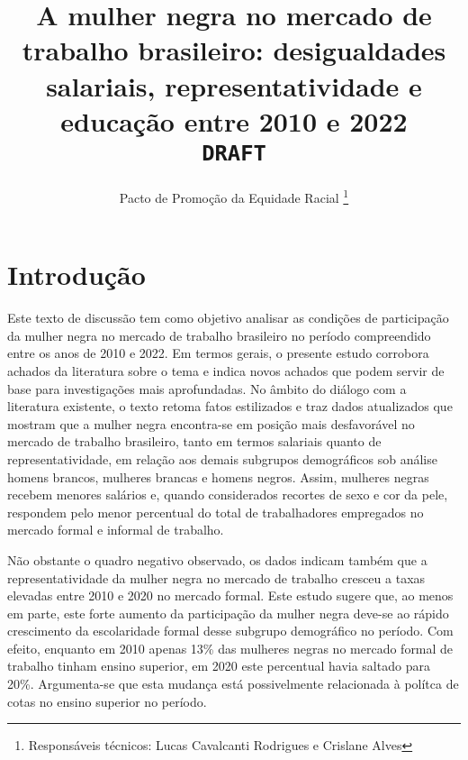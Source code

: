 \documentclass[12pt]{article}
\begin{document}
 

\linespread{1.1}

\title{%
  A mulher negra no mercado de trabalho brasileiro: desigualdades salariais, representatividade e educação entre 2010 e 2022\\
  \vspace{1cm}
  \Large \texttt{\MakeUppercase{DRAFT}}}

\author{Pacto de Promoção da Equidade Racial \thanks{Responsáveis técnicos: Lucas Cavalcanti Rodrigues e Crislane Alves}}


\maketitle

\section{Introdução}


\par Este texto de discussão tem como objetivo analisar as condições de participação da mulher negra no mercado de trabalho brasileiro no período compreendido entre os anos de 2010 e 2022. Em termos gerais, o presente estudo corrobora achados da literatura sobre o tema e indica novos achados que podem servir de base para investigações mais aprofundadas. No âmbito do diálogo com a literatura existente, o texto retoma fatos estilizados e traz dados atualizados que mostram que a mulher negra encontra-se em posição mais desfavorável no mercado de trabalho brasileiro, tanto em termos salariais quanto de representatividade, em relação aos demais subgrupos de\-mo\-grá\-fi\-cos sob análise \textemdash homens brancos, mulheres brancas e homens negros. Assim, mulheres negras recebem menores salários e, quando considerados recortes de sexo e cor da pele, respondem pelo menor percentual do total de trabalhadores empregados no mercado formal e informal de trabalho. 

\par Não obstante o quadro negativo observado, os dados indicam também que a representatividade da mulher negra no mercado de trabalho cresceu a taxas elevadas entre 2010 e 2020 no mercado formal. Este estudo sugere que, ao menos em parte, este forte aumento da participação da mulher negra deve-se ao rápido crescimento da escolaridade formal desse subgrupo demográfico no período. Com efeito, enquanto em 2010 apenas 13\% das mulheres negras no mercado formal de trabalho tinham ensino superior, em 2020 este percentual havia saltado para 20\%. Argumenta-se que esta mudança está possivelmente relacionada à polítca de cotas no ensino superior no período.
\end{document}
